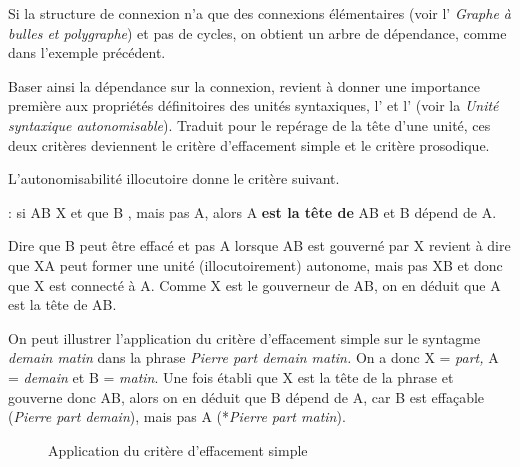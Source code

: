 Si la structure de connexion n’a que des connexions élémentaires (voir l’ \textit{Graphe à bulles et polygraphe}) et pas de cycles, on obtient un arbre de dépendance, comme dans l’exemple précédent.

Baser ainsi la dépendance sur la connexion, revient à donner une importance première aux propriétés définitoires des unités syntaxiques, l’ et l’ (voir la  \textit{Unité syntaxique autonomisable}). Traduit pour le repérage de la tête d’une unité, ces deux critères deviennent le critère d’effacement simple et le critère prosodique.

L’autonomisabilité illocutoire donne le critère suivant.

{ : si  AB  X et que B , mais pas A, alors A \textbf{est la tête de} AB et B dépend de A.}

Dire que B peut être effacé et pas A lorsque AB est gouverné par X revient à dire que XA peut former une unité (illocutoirement) autonome, mais pas XB et donc que X est connecté à A. Comme X est le gouverneur de AB, on en déduit que A est la tête de AB.

On peut illustrer l'application du critère d'effacement simple sur le syntagme \textit{demain matin} dans la phrase \textit{Pierre part demain matin.}
On a donc X = \textit{part,} A = \textit{demain} et B = \textit{matin}. Une fois établi que X est la tête de la phrase et gouverne donc AB, alors on en déduit que B dépend de A, car B est effaçable (\textit{Pierre part demain}), mais pas A (*\textit{Pierre part matin}).

\begin{figure}
\caption{Application du critère d’effacement simple}
\end{figure}

